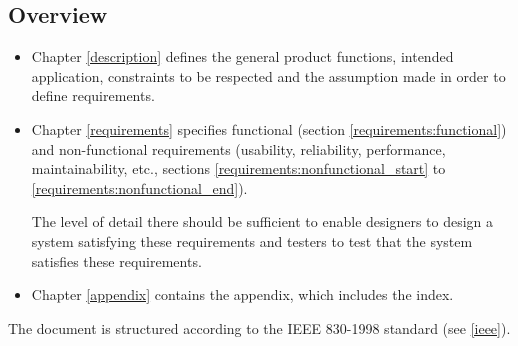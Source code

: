 \subsection{Overview}
\label{intro:overview}
\begin{itemize}
  \item Chapter \ref{description} defines the general product functions, intended application, constraints to be respected and the assumption made in order to define requirements.
  \item Chapter \ref{requirements} specifies functional (section \ref{requirements:functional}) and non-functional requirements (usability, reliability, performance, maintainability, etc., sections \ref{requirements:nonfunctional_start} to \ref{requirements:nonfunctional_end}).

The level of detail there should be sufficient to enable designers to design a system satisfying these requirements and testers to test that the system satisfies these requirements.
  \item Chapter \ref{appendix} contains the appendix, which includes the index.
\end{itemize}
The document is structured according to the IEEE 830-1998 standard (see \ref{ieee}).
